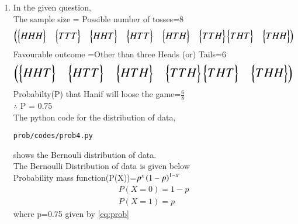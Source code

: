\renewcommand{\theequation}{\theenumi}
\begin{enumerate}[label=\arabic*.,ref=\thesubsubsection.\theenumi]

\item In the given question,
\\
The sample size = Possible number of tosses=8
\begin{align}
\resizebox{\columnwidth}{!}{%
\myvec{\bmat{HHH}&\bmat{TTT}&\bmat{HHT}&\bmat{HTT}&\bmat{HTH}&\bmat{TTH}\bmat{THT}&\bmat{THH}}
}
\end{align}
Favourable outcome =Other than three Heads (or) Tails=6
\begin{align}
\resizebox{\columnwidth}{!}{%
\myvec{\bmat{HHT}&\bmat{HTT}&\bmat{HTH}&\bmat{TTH}\bmat{THT}&\bmat{THH}}
}
\end{align}
Probabilty(P) that Hanif will loose the game=$\frac{6}{8}$
\\
$\therefore$ P = 0.75
\label{eq:prob}
\\
The python code for the distribution of data,
\begin{lstlisting}
prob/codes/prob4.py
\end{lstlisting}
shows the Bernouli distribution of data.
\\
The Bernoulli Distribution of data is given below
\\
Probability mass function(P(X))=$p^x\left(1-p\right)^{1-x}$
\begin{align}
P(X=0)=1-p
\\
P(X=1)=p
\end{align}
where p=0.75 given by \ref{eq:prob}
\end{enumerate}
